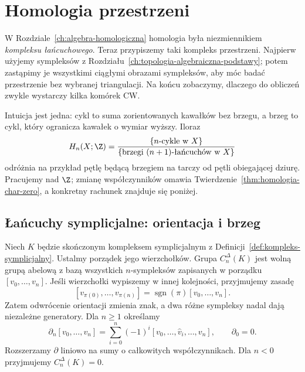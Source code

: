 \chapter{Homologia przestrzeni}
\label{ch:homologia-przestrzeni}

\providecommand{\atlasref}[2]{#2}

W Rozdziale~\ref{ch:algebra-homologiczna} homologia była
niezmiennikiem \emph{kompleksu łańcuchowego}.
Teraz przypiszemy taki kompleks przestrzeni. Najpierw
użyjemy sympleksów z Rozdziału~\ref{ch:topologia-algebraiczna-podstawy};
potem zastąpimy je wszystkimi ciągłymi obrazami sympleksów,
aby móc badać przestrzenie bez wybranej triangulacji. Na końcu
zobaczymy, dlaczego do obliczeń zwykle wystarczy
kilka komórek CW.

Intuicja jest jedna: cykl to suma zorientowanych kawałków
bez brzegu, a brzeg to cykl, który ogranicza kawałek
o wymiar wyższy. Iloraz
\[
 H_n(X;\Z)=
 \frac{\{\text{$n$-cykle w $X$}\}}
 {\{\text{brzegi $(n+1)$-łańcuchów w $X$}\}}
\]
odróżnia na przykład pętlę będącą brzegiem na tarczy od pętli
obiegającej dziurę. Pracujemy nad $\Z$; zmianę
współczynników omawia
Twierdzenie~\ref{thm:homologia-char-zero},
a konkretny rachunek znajduje się poniżej.

\section{Łańcuchy symplicjalne: orientacja i brzeg}
\label{sec:homologia-symplicjalna}

\begin{definicja}
\label{def:homologia-symplicjalna}
Niech $K$ będzie skończonym kompleksem symplicjalnym
z Definicji~\ref{def:kompleks-symplicjalny}.
Ustalmy porządek jego wierzchołków. Grupa
$C_n^\Delta(K)$ jest wolną grupą abelową z bazą
wszystkich $n$-sympleksów zapisanych w porządku
$[v_0,\ldots,v_n]$. Jeśli wierzchołki wypiszemy
w innej kolejności, przyjmujemy zasadę
\[
 [v_{\pi(0)},\ldots,v_{\pi(n)}]
 =\operatorname{sgn}(\pi)[v_0,\ldots,v_n].
\]
Zatem odwrócenie orientacji zmienia znak, a dwa
różne sympleksy nadal dają niezależne generatory.
Dla $n\geq1$ określamy
\begin{equation}\label{eq:brzeg-symplicjalny}
 \partial_n[v_0,\ldots,v_n]
 =\sum_{i=0}^n(-1)^i
 [v_0,\ldots,\widehat v_i,\ldots,v_n],
 \qquad \partial_0=0.
\end{equation}
Rozszerzamy $\partial$ liniowo na sumy
o całkowitych współczynnikach. Dla $n<0$ przyjmujemy $C_n^\Delta(K)=0$.
\end{definicja}

